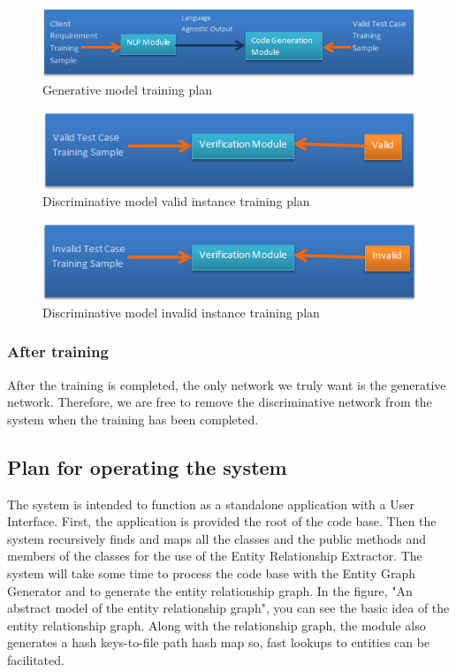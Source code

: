 \documentclass[conference, onecolumn, a4, 12pt]{IEEEtran}
\begin{document}
\begin{figure}
	\includegraphics[width=\linewidth]{Generative_model_training.png}
	\caption{Generative model training plan}
	\label{fig11}
\end{figure} 

\begin{figure}
	\includegraphics[width=\linewidth]{Discriminative_model_training.png}
	\caption{Discriminative model valid instance training plan}
	\label{fig12}
\end{figure} 

\begin{figure}
	\includegraphics[width=\linewidth]{Validation_module_negative.png}
	\caption{Discriminative model invalid instance training plan}
	\label{fig13}
\end{figure} 

\subsubsection{After training}
After the training is completed, the only network we truly want is the generative network. Therefore, we are free to remove the discriminative network from the system when the training has been completed.

\subsection{Plan for operating the system}
The system is intended to function as a standalone application with a User Interface. First, the application is provided the root of the code base. Then the system recursively finds and maps all the classes and the public methods and members of the classes for the use of the Entity Relationship Extractor. The system will take some time to process the code base with the Entity Graph Generator and to generate the entity relationship graph. In the figure, "An abstract model of the entity relationship graph", you can see the basic idea of the entity relationship graph. Along with the relationship graph, the module also generates a hash keys-to-file path hash map so, fast lookups to entities can be facilitated.
\end{document}
